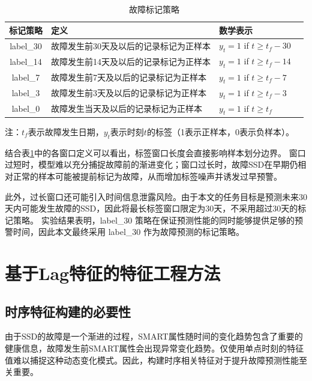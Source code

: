 \begin{table}[htbp]
    \caption{\label{tab:label-strategies}故障标记策略}
    \begin{tabularx}{\linewidth}{cX<{\centering}X<{\centering}X<{\centering}}
        \toprule
        标记策略 & 定义 & 数学表示 \\
        \midrule
        label\_30 & 故障发生前30天及以后的记录标记为正样本 & $y_t = 1$ if $t \geq t_f - 30$ \\
        label\_14 & 故障发生前14天及以后的记录标记为正样本 & $y_t = 1$ if $t \geq t_f - 14$ \\
        label\_7 & 故障发生前7天及以后的记录标记为正样本 & $y_t = 1$ if $t \geq t_f - 7$ \\
        label\_3 & 故障发生前3天及以后的记录标记为正样本 & $y_t = 1$ if $t \geq t_f - 3$ \\
        label\_0 & 故障发生当天及以后的记录标记为正样本 & $y_t = 1$ if $t \geq t_f$ \\
        \bottomrule
    \end{tabularx}

    \vspace{2pt}
    \begin{minipage}{\linewidth}
        \footnotesize 注：$t_f$表示故障发生日期，$y_t$表示时刻$t$的标签（1表示正样本，0表示负样本）。
    \end{minipage}
\end{table}

结合表\ref{tab:label-strategies}中的各窗口定义可以看出，标签窗口长度会直接影响样本划分边界。
窗口过短时，模型难以充分捕捉故障前的渐进变化；窗口过长时，故障SSD在早期仍相对正常的样本可能被提前标记为故障，从而增加标签噪声并诱发过早预警。

此外，过长窗口还可能引入时间信息泄露风险。由于本文的任务目标是预测未来30天内可能发生故障的SSD，因此将最长标签窗口限定为30天，不采用超过30天的标记策略。
实验结果表明，label\_30 策略在保证预测性能的同时能够提供足够的预警时间，因此本文最终采用 label\_30 作为故障预测的标记策略。

\section{基于Lag特征的特征工程方法}

\subsection{时序特征构建的必要性}

由于SSD的故障是一个渐进的过程，SMART属性随时间的变化趋势包含了重要的健康信息\cite{chakraborttii2023leveraging}，故障发生前SMART属性会出现异常变化趋势。仅使用单点时刻的特征值难以捕捉这种动态变化模式。因此，构建时序相关特征对于提升故障预测性能至关重要。

